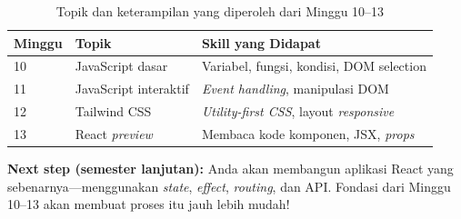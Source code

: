 \begin{table}[htbp]
\centering
\caption{Topik dan keterampilan yang diperoleh dari Minggu 10--13}
\label{tab:13-ringkasan}
\begin{tabular}{lll}
\toprule
\textbf{Minggu} & \textbf{Topik} & \textbf{Skill yang Didapat} \\
\midrule
10 & JavaScript dasar & Variabel, fungsi, kondisi, DOM selection \\
11 & JavaScript interaktif & \emph{Event handling}, manipulasi DOM \\
12 & Tailwind CSS & \emph{Utility-first CSS}, layout \emph{responsive} \\
13 & React \emph{preview} & Membaca kode komponen, JSX, \emph{props} \\
\bottomrule
\end{tabular}
\end{table}

\begin{tip}
\textbf{Next step (semester lanjutan):} Anda akan membangun aplikasi React yang sebenarnya---menggunakan \emph{state}, \emph{effect}, \emph{routing}, dan API. Fondasi dari Minggu 10--13 akan membuat proses itu jauh lebih mudah!
\end{tip}
